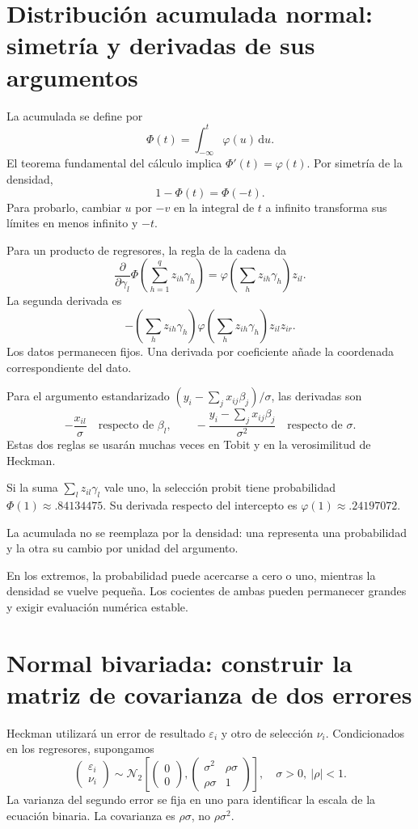 \documentclass[11pt,a4paper]{article}
\newcommand{\dd}{\,\mathrm d}
\begin{document}
\clearpage
\section{Distribución acumulada normal: simetría y derivadas de sus argumentos}\label{unidad63}
La acumulada se define por
\[
\Phi(t)=\int_{-\infty}^t\varphi(u)\dd u.
\]
El teorema fundamental del cálculo implica
\(\Phi'(t)=\varphi(t)\).
Por simetría de la densidad,
\[
1-\Phi(t)=\Phi(-t).
\]
Para probarlo, cambiar \(u\) por \(-v\)
en la integral de \(t\) a infinito
transforma sus límites en menos infinito y \(-t\).

Para un producto de regresores,
la regla de la cadena da
\[
\frac{\partial}{\partial\gamma_l}
\Phi\left(\sum_{h=1}^qz_{ih}\gamma_h\right)
=\varphi\left(\sum_hz_{ih}\gamma_h\right)z_{il}.
\]
La segunda derivada es
\[
-\left(\sum_hz_{ih}\gamma_h\right)
\varphi\left(\sum_hz_{ih}\gamma_h\right)
z_{il}z_{ir}.
\]
Los datos permanecen fijos.
Una derivada por coeficiente añade
la coordenada correspondiente del dato.

Para el argumento estandarizado
\((y_i-\sum_jx_{ij}\beta_j)/\sigma\),
las derivadas son
\[
-\frac{x_{il}}{\sigma}
\quad\text{respecto de }\beta_l,\qquad
-\frac{y_i-\sum_jx_{ij}\beta_j}{\sigma^2}
\quad\text{respecto de }\sigma.
\]
Estas dos reglas se usarán muchas veces
en Tobit y en la verosimilitud de Heckman.

\begin{ejemplo}
Si la suma \(\sum_lz_{il}\gamma_l\)
vale uno, la selección probit tiene
probabilidad \(\Phi(1)\approx.84134475\).
Su derivada respecto del intercepto
es \(\varphi(1)\approx.24197072\).
\end{ejemplo}
La acumulada no se reemplaza por
la densidad: una representa una
probabilidad y la otra su cambio
por unidad del argumento.

En los extremos, la probabilidad
puede acercarse a cero o uno,
mientras la densidad se vuelve pequeña.
Los cocientes de ambas pueden
permanecer grandes y exigir
evaluación numérica estable.

\clearpage
\section{Normal bivariada: construir la matriz de covarianza de dos errores}\label{unidad64}
Heckman utilizará un error de resultado
\(\varepsilon_i\) y otro de selección \(\nu_i\).
Condicionados en los regresores, supongamos
\[
\begin{pmatrix}\varepsilon_i\\\nu_i\end{pmatrix}
\sim\mathcal N_2\left[
\begin{pmatrix}0\\0\end{pmatrix},
\begin{pmatrix}\sigma^2&\rho\sigma\\\rho\sigma&1\end{pmatrix}
\right],
\quad \sigma>0,\ |\rho|<1.
\]
La varianza del segundo error se fija en uno
para identificar la escala de la ecuación binaria.
La covarianza es \(\rho\sigma\),
no \(\rho\sigma^2\).
\end{document}
